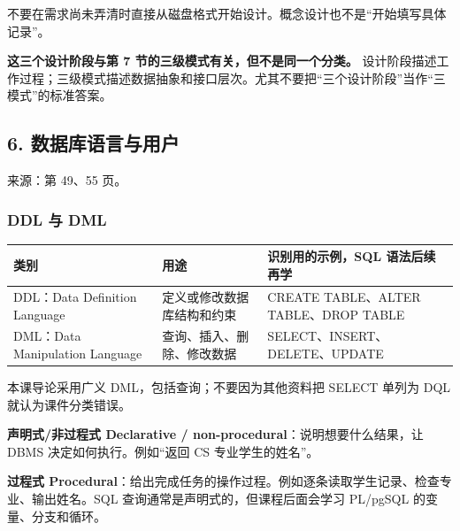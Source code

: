 不要在需求尚未弄清时直接从磁盘格式开始设计。概念设计也不是``开始填写具体记录''。

\textbf{这三个设计阶段与第 7 节的三级模式有关，但不是同一个分类。} 设计阶段描述工作过程；三级模式描述数据抽象和接口层次。尤其不要把``三个设计阶段''当作``三模式''的标准答案。

\subsection{6. 数据库语言与用户}\label{01_database_fundamentals_zh-ux6570ux636eux5e93ux8bedux8a00ux4e0eux7528ux6237}

来源：第 49、55 页。

\subsubsection{DDL 与 DML}\label{01_database_fundamentals_zh-ddl-ux4e0e-dml}

\begin{longtable}[]{@{}
  >{\raggedright\arraybackslash}p{}
  >{\raggedright\arraybackslash}p{}
  >{\raggedright\arraybackslash}p{}@{}}
\toprule\noalign{}
\begin{minipage}[b]{\linewidth}\raggedright
类别
\end{minipage} & \begin{minipage}[b]{\linewidth}\raggedright
用途
\end{minipage} & \begin{minipage}[b]{\linewidth}\raggedright
识别用的示例，SQL 语法后续再学
\end{minipage} \\
\midrule\noalign{}
\endhead
\bottomrule\noalign{}
\endlastfoot
DDL：Data Definition Language & 定义或修改数据库结构和约束 & CREATE TABLE、ALTER TABLE、DROP TABLE \\
DML：Data Manipulation Language & 查询、插入、删除、修改数据 & SELECT、INSERT、DELETE、UPDATE \\
\end{longtable}

本课导论采用广义 DML，包括查询；不要因为其他资料把 SELECT 单列为 DQL 就认为课件分类错误。

\textbf{声明式/非过程式 Declarative / non-procedural}：说明想要什么结果，让 DBMS 决定如何执行。例如``返回 CS 专业学生的姓名''。

\textbf{过程式 Procedural}：给出完成任务的操作过程。例如逐条读取学生记录、检查专业、输出姓名。SQL 查询通常是声明式的，但课程后面会学习 PL/pgSQL 的变量、分支和循环。

